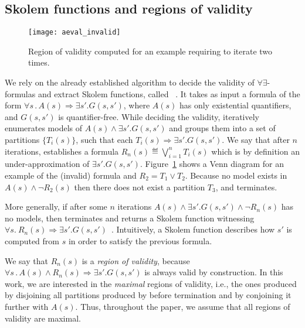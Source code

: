 \subsection{Skolem functions and regions of validity}
\label{sec:aeval}

\begin{figure}[!t]
\centering
\texttt{[image: aeval\_invalid]}
\caption{Region of validity computed for an example requiring \aeval to iterate two times.}
\label{fg:aeval}
\end{figure}


We rely on the already established algorithm to decide the validity of $\forall\exists$-formulas and extract Skolem functions, called \aeval~\cite{fedyukovich2015automated}.
It takes as input a formula of the form $\forall s \,.\,  A(s) \Rightarrow \exists s' . G(s,s')$,
where $A(s)$ has only existential quantifiers, and $G(s,s')$ is quantifier-free.
While deciding the validity, \aeval iteratively enumerates models of
$A(s) \land \exists s'. G(s, s')$ and groups them into a set of partitions $\{T_i(s)\}$, such that each $T_i(s) \Rightarrow \exists s' . G (s, s')$.
We say that after $n$ iterations, \aeval establishes a formula $R_n(s) \eqdef \bigvee_{i=1}^n T_i(s)$ which is by definition an under-approximation of $\exists s' . G (s, s')$.
Figure~\ref{fg:aeval} shows a Venn diagram for an example of the (invalid) formula and $R_2 = T_1 \lor T_2$.
Because no model exists in $A(s) \land \neg{R_2(s)}$ then there does not exist a partition $T_3$, and \aeval terminates.

More generally, if after some $n$ iterations
$A(s) \land \exists s'. G(s, s') \land \neg R_n(s)$ has no models,
then \aeval terminates and returns a Skolem function witnessing
$\forall s.~ R_n(s) \Rightarrow \exists s' .
G(s,s')$~\cite{katis2016synthesis}. Intuitively, a Skolem function
describes how $s'$ is computed from $s$ in order to satisfy the
previous formula.

We say that $R_n(s)$ is a \emph{region of validity}, because $\forall s \,.\,  A(s) \land R_n(s) \Rightarrow \exists s' . G(s,s')$ is always valid by construction.
In this work, we are interested in the \emph{maximal} regions of validity, i.e., the ones produced by disjoining all partitions produced by \aeval before termination and by conjoining it further with $A(s)$.
Thus, throughout the paper, we assume that all regions of validity are maximal.

